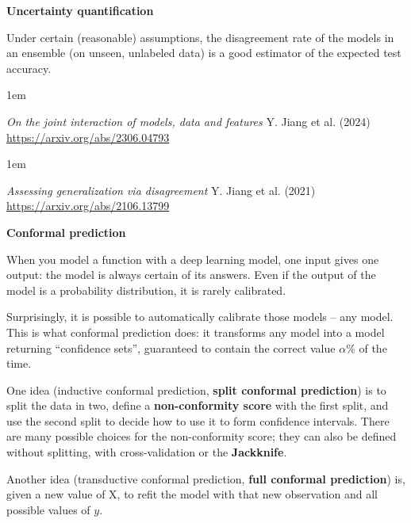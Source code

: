 \documentclass[a5paper]{article}
\let\d\textbf
\newenvironment{reference}{%
  \medskip\goodbreak
  \parskip 0pt
  \raggedright
  \leftskip 1em
  \obeylines
}{\par\medskip\goodbreak}
\def\section#1{\clearpage{\vspace*{0cm}\LARGE\centering\bfseries #1\par\bigskip\bigskip}}
\def\subsection#1{{\par\bigskip\goodbreak\large\bfseries #1\par}}
\begin{document}
\section{Uncertainty quantification}

\subsection{Uncertainty quantification}

Under certain (reasonable) assumptions,
the disagreement rate of the models in an ensemble
(on unseen, unlabeled data)
is a good estimator of the expected test accuracy.

\begin{reference}
  \emph{On the joint interaction of models, data and features}
  Y. Jiang et al. (2024)
  \url{https://arxiv.org/abs/2306.04793}
\end{reference}

\begin{reference}
  \emph{Assessing generalization via disagreement}
  Y. Jiang et al. (2021)
  \url{https://arxiv.org/abs/2106.13799}
\end{reference}

\subsection{Conformal prediction}

When you model a function with a deep learning model,
one input gives one output: the model is always certain of its answers. 
Even if the output of the model is a probability distribution,
it is rarely calibrated.

Surprisingly, it is possible to automatically calibrate those models -- any model.
This is what conformal prediction does: it transforms any model
into a model returning ``confidence sets'', guaranteed to contain the correct value $\alpha$\% of the time.

One idea (inductive conformal prediction, \d{split conformal prediction}) is to split the data in two,
define a \d{non-conformity score} with the first split,
and use the second split to decide how to use it to form confidence intervals.
There are many possible choices for the non-conformity score;
they can also be defined without splitting, with cross-validation or the \d{Jackknife}.

Another idea (transductive conformal prediction, \d{full conformal prediction}) is, given a new value of X, to refit the model
with that new observation and all possible values of $y$.
\end{document}

